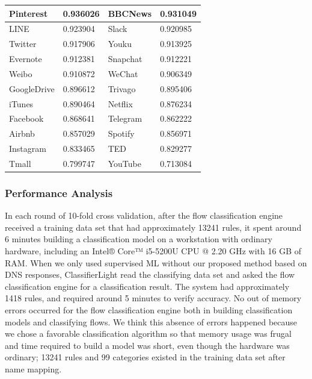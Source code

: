 \documentclass[journal]{IEEEtran}
\begin{document}
\begin{table}[!t]
\begin{tabular}{|l|l|l|l|}
Pinterest           & 0.936026            & BBCNews           & 0.931049           \\ \hline
LINE                & 0.923904            & Slack             & 0.920985           \\ \hline
Twitter             & 0.917906            & Youku             & 0.913925           \\ \hline
Evernote            & 0.912381            & Snapchat          & 0.912221           \\ \hline
Weibo               & 0.910872            & WeChat            & 0.906349           \\ \hline
GoogleDrive         & 0.896612            & Trivago           & 0.895406           \\ \hline
iTunes              & 0.890464            & Netflix           & 0.876234           \\ \hline
Facebook            & 0.868641            & Telegram          & 0.862222           \\ \hline
Airbnb              & 0.857029            & Spotify           & 0.856971           \\ \hline
Instagram           & 0.833465            & TED               & 0.829277           \\ \hline
Tmall               & 0.799747            & YouTube           & 0.713084           \\ \hline
\end{tabular}
\end{table}

\subsubsection{Performance Analysis}
In each round of 10-fold cross validation, after the flow classification engine received a training data set that had approximately 13241 rules, it spent around 6 minutes building a classification model on a workstation with ordinary hardware, including an Intel® Core™ i5-5200U CPU @ 2.20 GHz with 16 GB of RAM. When we only used supervised ML without our proposed method based on DNS responses, ClassifierLight read the classifying data set and asked the flow classification engine for a classification result. The system had approximately 1418 rules, and required around 5 minutes to verify accuracy. No out of memory errors occurred for the flow classification engine both in building classification models and classifying flows. We think this absence of errors happened because we chose a favorable classification algorithm so that memory usage was frugal and time required to build a model was short, even though the hardware was ordinary; 13241 rules and 99 categories existed in the training data set after name mapping.
\end{document}
